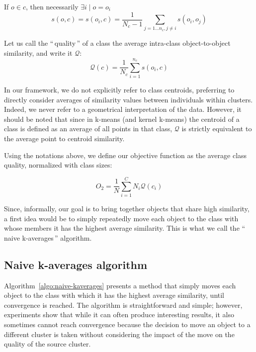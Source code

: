 \documentclass[natbib,smallextended]{svjour3}
\newcommand{\gl}[1]{``\,#1\,''} %
\begin{document}
If $o \in c$, then necessarily $\exists i \mid o = o_i$
\begin{equation}
  s\left(o,c\right) = s\left(o_i, c\right) = \frac{1}{N_c-1} \sum_{j=1 \ldots n_c, j \neq i} s\left(o_i, o_j\right)
  	 \label{eq:soc_inclass}
\end{equation}

Let us call the \gl{quality} of a class the average intra-class object-to-object similarity, and write it $\mathcal{Q}$:
\[
\mathcal{Q}\left(c\right) = \frac{1}{N_c} \sum_{i=1}^{n_c} s\left(o_i, c\right)
\]

In our framework, we do not explicitly refer to class centroids, preferring to directly consider averages of similarity values between individuals within clusters. Indeed, we never refer to a geometrical interpretation of the data. However, it should be noted that since in k-means (and kernel k-means) the centroid of a class is defined as an average of all points in that class, $\mathcal{Q}$ is strictly equivalent to the average point to centroid similarity.

Using the notations above, we define our objective function as the average class quality, normalized with class sizes:

\[
O_2 = \frac{1}{N} \sum_{i=1}^{C} N_i \mathcal{Q}(c_i)
\]

Since, informally, our goal is to bring together objects that share high similarity, a first idea would be to simply repeatedly move each object to the class with whose members it has the highest average similarity. This is what we call the \gl{naive k-averages} algorithm.

\subsection{Naive k-averages algorithm}

Algorithm~\ref{algo:naive-kaverages} presents a method that simply moves each object to the class with which it has the highest average similarity, until convergence is reached. The algorithm is straightforward and simple; however, experiments show that while it can often produce interesting results, it also sometimes cannot reach convergence because the decision to move an object to a different cluster is taken without considering the impact of the move on the quality of the source cluster.
\end{document}
